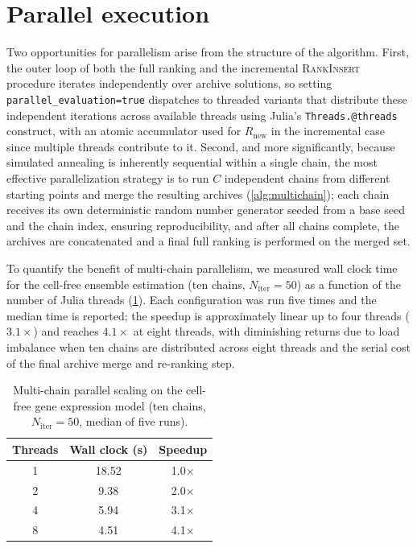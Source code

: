 \documentclass[12pt]{article}
\begin{document}
\section{Parallel execution}\label{sec:si_parallel}
Two opportunities for parallelism arise from the structure of the algorithm.
First, the outer loop of both the full ranking and the incremental \textsc{RankInsert} procedure iterates independently over archive solutions, so setting \texttt{parallel\_evaluation=true} dispatches to threaded variants that distribute these independent iterations across available threads using Julia's \texttt{Threads.@threads} construct, with an atomic accumulator used for $R_{\text{new}}$ in the incremental case since multiple threads contribute to it.
Second, and more significantly, because simulated annealing is inherently sequential within a single chain, the most effective parallelization strategy is to run $C$ independent chains from different starting points and merge the resulting archives (\cref{alg:multichain}); each chain receives its own deterministic random number generator seeded from a base seed and the chain index, ensuring reproducibility, and after all chains complete, the archives are concatenated and a final full ranking is performed on the merged set.

To quantify the benefit of multi-chain parallelism, we measured wall clock time for the cell-free ensemble estimation (ten chains, $N_{\text{iter}} = 50$) as a function of the number of Julia threads (\cref{tab:scaling}).
Each configuration was run five times and the median time is reported; the speedup is approximately linear up to four threads ($3.1\times$) and reaches $4.1\times$ at eight threads, with diminishing returns due to load imbalance when ten chains are distributed across eight threads and the serial cost of the final archive merge and re-ranking step.

\begin{table}[ht]
\centering
\caption{Multi-chain parallel scaling on the cell-free gene expression model (ten chains, $N_{\text{iter}} = 50$, median of five runs).}\label{tab:scaling}
\begin{tabular}{@{}ccc@{}}
\toprule
\textbf{Threads} & \textbf{Wall clock (s)} & \textbf{Speedup} \\
\midrule
1 & 18.52 & 1.0$\times$ \\
2 &  9.38 & 2.0$\times$ \\
4 &  5.94 & 3.1$\times$ \\
8 &  4.51 & 4.1$\times$ \\
\bottomrule
\end{tabular}
\end{table}
\end{document}
